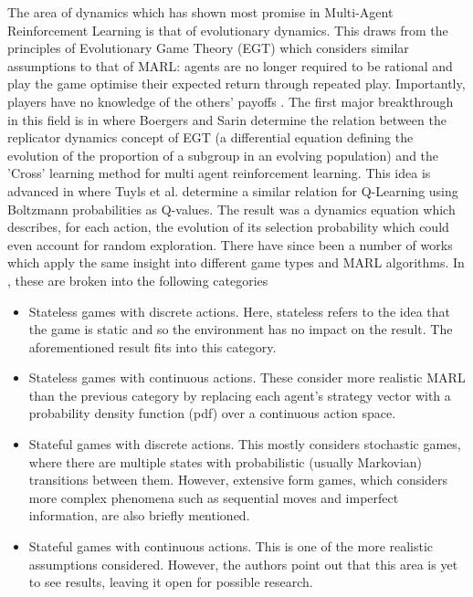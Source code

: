 \documentclass[../sample.tex]{subfiles}
\begin{document}
The area of dynamics which has shown most promise in Multi-Agent Reinforcement Learning is that of
evolutionary dynamics. This draws from the principles of Evolutionary Game Theory (EGT) which
considers similar assumptions to that of MARL: agents are no longer required to be rational and play
the game optimise their expected return through repeated play. Importantly, players have no
knowledge of the others' payoffs \cite{Tuyls2006AnGames}. The first major breakthrough in this field
is in \cite{Borgers1997} where Boergers and Sarin determine the relation between the replicator
dynamics concept of EGT (a differential equation defining the evolution of the proportion of a
subgroup in an evolving population) and the 'Cross' learning method for multi agent reinforcement
learning. This idea is advanced in \cite{Tuyls2006AnGames} where Tuyls et al. determine  a similar
relation for Q-Learning using Boltzmann probabilities as Q-values. The result was a dynamics
equation which describes, for each action, the evolution of its selection probability which could
even account for random exploration. There have since been a number of works which apply the same
insight into different game types and MARL algorithms. In \cite{Bloembergen2015}, these are broken
into the following categories

\begin{itemize}
	\item Stateless games with discrete actions. Here, stateless refers to the idea that the game is
	static and so the environment has no impact on the result. The aforementioned result 
	\cite{Tuyls2006AnGames} fits into this category.
	\item Stateless games with continuous actions. These consider more realistic MARL than the
	previous category by replacing each agent's strategy vector with a probability density function 
	(pdf) over a continuous action space.
	\item Stateful games with discrete actions. This mostly considers stochastic games, where there
	are multiple states with probabilistic (usually Markovian) transitions between them. However,
	extensive form games, which considers more complex phenomena such as sequential moves and
	imperfect information, are also briefly mentioned.
	\item Stateful games with continuous actions. This is one of the more realistic assumptions
	considered. However, the authors point out that this area is yet to see results, leaving it open
	for possible research.
\end{itemize}
\end{document}
